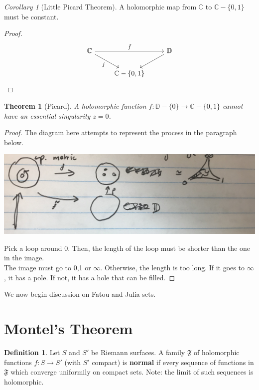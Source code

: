 \documentclass[a4paper, 11pt]{book}
\newtheorem{theorem}{Theorem}
\theoremstyle{definition}
\newtheorem{definition}{Definition}[section]
\theoremstyle{remark}
\newtheorem{corollary}{Corollary}[theorem]
\begin{document}
    \begin{corollary}[Little Picard Theorem]
        A holomorphic map from $\mathbb{C}$ to $\mathbb{C}-\{0,1\}$ must be constant.
    \end{corollary}
    \begin{proof}
        \begin{equation*}
            \begin{tikzcd}
                \mathbb{C} \arrow[rr, "\tilde{f}"] \arrow[dr, "f",swap]&  & \mathbb{D}\arrow[dl, ""]\\ 
            & \mathbb{C}-\{0,1\} &
            \end{tikzcd}
        \end{equation*}
    \end{proof}

    \begin{theorem}[Picard]
        A holomorphic function $f:\mathbb{D}-\{0\}\to\mathbb{C}-\{0,1\}$ cannot have an essential singularity $z=0$.
    \end{theorem}
    \begin{proof}
        The diagram here attempts to represent the process in the paragraph below.
        \begin{center}
            \includegraphics[scale=0.05]{IMG_1023}
        \end{center}
        Pick a loop around 0. Then, the length of the loop must be shorter than the one in the image.\\
        The image must go to 0,1 or $\infty$. Otherwise, the length is too long. If it goes to $\infty$, it has a pole. If not, it
        has a hole that can be filled.
    \end{proof}

    We now begin discussion on Fatou and Julia sets.

    \section{Montel's Theorem}

    \begin{definition}
        Let $S$ and $S'$ be Riemann surfaces.
        A family $\mathfrak{F}$ of holomorphic functions $f:S\to S'$ (with $S'$ compact) is \textbf{normal} if every sequence
        of functions in $\mathfrak{F}$ which converge uniformily on compact sets. Note: the limit of such sequences is holomorphic.
    \end{definition}
\end{document}

